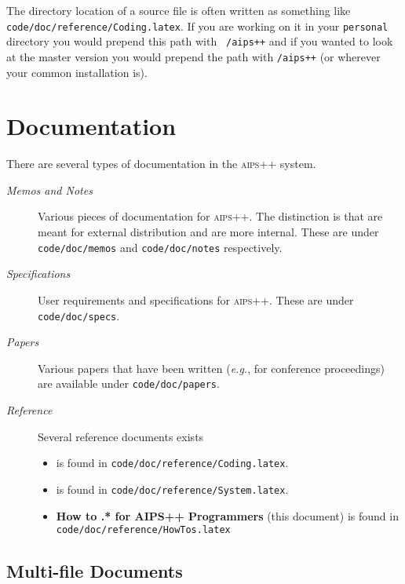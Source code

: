 The directory location of a source file is often written as something like
\texttt{code/doc/reference/Coding.latex}. If you are working on it in your
\texttt{personal} directory you would prepend this path with
\texttt{~/aips++} and if you wanted to look at the master version you
would prepend the path with \texttt{/aips++} (or wherever your common
installation is).

\section{Documentation}

There are several types of documentation in the \textsc{aips++} system.
\begin{description}
\item[\emph{Memos and Notes}]
Various pieces of documentation for \textsc{aips++}. The distinction is
that  are meant
for external distribution and  are more internal.  
These are under \texttt{code/doc/memos} and \texttt{code/doc/notes}
respectively.
\item[\emph{Specifications}]
User requirements and specifications for \textsc{aips++}. These are under
\texttt{code/doc/specs}.
\item[\emph{Papers}]
Various papers that have been written (\textit{e.g.}, for conference
proceedings) are available under \texttt{code/doc/papers}.
\item[\emph{Reference}]
Several reference documents exists
\begin{itemize}
\item \textbf{} is found in \texttt{code/doc/reference/Coding.latex}.
\item \textbf{} is found in \texttt{code/doc/reference/System.latex}.
\item \textbf{How to .* for AIPS++ Programmers} (this document) is found in \texttt{code/doc/reference/HowTos.latex}
\end{itemize}
\end{description}


\label{Doc Sources}
\subsection{Multi-file Documents}

